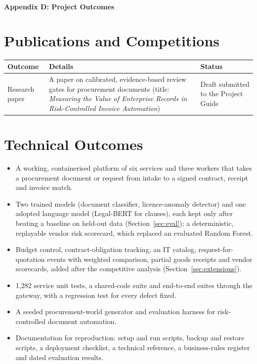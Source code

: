 
\vspace*{5cm}
\begin{centering}
{\LARGE\bfseries Appendix D: Project Outcomes}\\
\end{centering}

\newpage

\section*{Publications and Competitions}
\begin{center}
\tablestyle
\begin{tabularx}{\textwidth}{|L{0.22\textwidth}|Y|L{0.18\textwidth}|}
\hline
\textbf{Outcome} & \textbf{Details} & \textbf{Status} \\ \hline
Research paper & A paper on calibrated, evidence-based review gates for procurement documents (title: \emph{Measuring the Value of Enterprise Records in Risk-Controlled Invoice Automation}) & Draft submitted to the Project Guide \\ \hline
\end{tabularx}
\end{center}

\section*{Technical Outcomes}
\begin{itemize}
  \item A working, containerised platform of six services and three workers that takes a procurement document or request from intake to a signed contract, receipt and invoice match.
  \item Two trained models (document classifier, licence-anomaly detector) and one adopted language model (Legal-BERT for clauses), each kept only after beating a baseline on held-out data (Section~\ref{sec:eval}); a deterministic, replayable vendor risk scorecard, which replaced an evaluated Random Forest.
  \item Budget control, contract-obligation tracking, an IT catalog, request-for-quotation events with weighted comparison, partial goods receipts and vendor scorecards, added after the competitive analysis (Section~\ref{sec:extensions}).
  \item 1,282 service unit tests, a shared-code suite and end-to-end suites through the gateway, with a regression test for every defect fixed.
  \item A seeded procurement-world generator and evaluation harness for risk-controlled document automation.
  \item Documentation for reproduction: setup and run scripts, backup and restore scripts, a deployment checklist, a technical reference, a business-rules register and dated evaluation results.
\end{itemize}